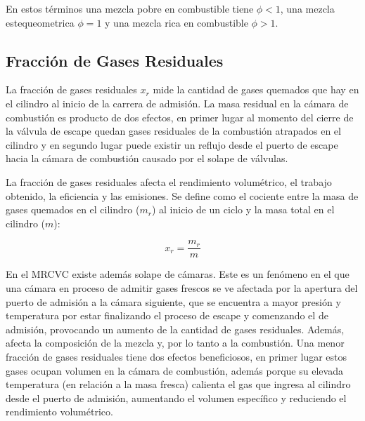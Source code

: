 En estos términos una mezcla pobre en combustible tiene $\phi < 1$, una mezcla
estequeometrica $\phi=1$ y una mezcla rica en combustible $\phi > 1$.


\subsection{Fracción de Gases Residuales}
%
La fracción de gases residuales $x_r$ mide la cantidad de gases quemados que hay
en el cilindro al inicio de la carrera de admisión.
%
La masa residual en la cámara de combustión es producto de dos efectos, en
primer lugar al momento del cierre de la válvula de escape quedan gases
residuales de la combustión atrapados en el cilindro y en segundo lugar puede
existir un reflujo desde el puerto de escape hacia la cámara de combustión
causado por el solape de válvulas.

La fracción de gases residuales afecta el rendimiento volumétrico, el trabajo
obtenido, la eficiencia y las emisiones.
%
Se define como el cociente entre la masa de gases quemados en el cilindro
($m_{r}$) al inicio de un ciclo y la masa total en el cilindro ($m$):


\begin{equation}
    x_{r} = \frac{m_{r}}{m}
\end{equation}


En el MRCVC existe además solape de cámaras.
%
Este es un fenómeno en el que una cámara en proceso de admitir gases frescos se
ve afectada por la apertura del puerto de admisión a la cámara siguiente, que se
encuentra a mayor presión y temperatura por estar finalizando el proceso de
escape y comenzando el de admisión, provocando un aumento de la cantidad de gases
residuales.
%
Además, afecta la composición de la mezcla y, por lo tanto a la combustión.
%
Una menor fracción de gases residuales tiene dos efectos beneficiosos, en
primer lugar estos gases ocupan volumen en la cámara de combustión, además
porque su elevada temperatura (en relación a la masa fresca) calienta el gas que
ingresa al cilindro desde el puerto de admisión, aumentando el volumen
específico y reduciendo el rendimiento volumétrico.



